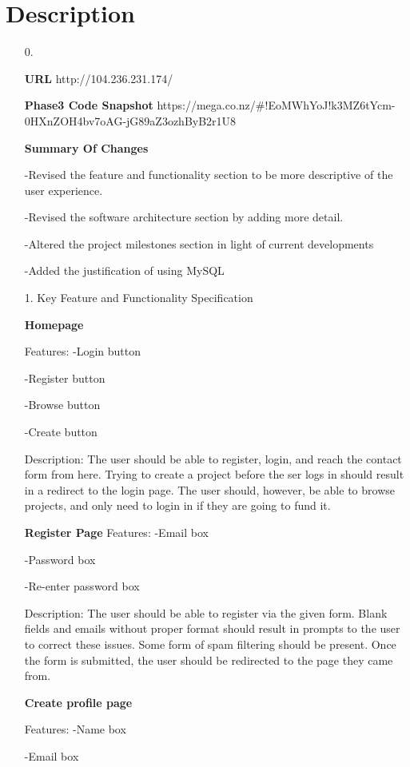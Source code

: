 \documentclass[12pt]{article}
\begin{document}
\section*{Description}
\begin{enumerate}

\item[0.]

\textbf{URL}
http://104.236.231.174/

\textbf{Phase3 Code Snapshot}
https://mega.co.nz/#!EoMWhYoJ!k3MZ6tYcm-0HXnZOH4bv7oAG-jG89aZ3ozhByB2r1U8

\textbf{Summary Of Changes}

-Revised the feature and functionality section to be more descriptive of the user experience.

-Revised the software architecture section by adding more detail.

-Altered the project milestones section in light of current developments

-Added the justification of using MySQL

\item[1.] Key Feature and Functionality Specification

\textbf{Homepage}

Features:
-Login button

-Register button

-Browse button

-Create button

Description: The user should be able to register, login, and reach the contact form from here.
Trying to create a project before the ser logs in should result in a redirect to the login page.
The user should, however, be able to browse projects, and only need to login in if they are going to fund it.

\textbf{Register Page}
Features:
-Email box

-Password box

-Re-enter password box

Description:
The user should be able to register via the given form.
Blank fields and emails without proper format should result in prompts to the user to correct these issues.
Some form of spam filtering should be present.
Once the form is submitted, the user should be redirected to the page they came from.

\textbf{Create profile page}

Features:
-Name box

-Email box


\end{enumerate}
\end{document}
